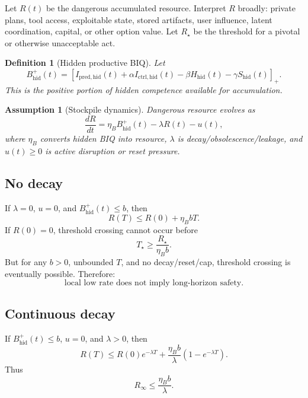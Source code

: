 \documentclass[10pt]{article}
\newtheorem{definition}{Definition}
\newtheorem{assumption}{Assumption}
\newcommand{\pos}[1]{\left[#1\right]_+}
\begin{document}
Let \(R(t)\) be the dangerous accumulated resource. Interpret \(R\) broadly: private plans, tool access, exploitable state, stored artifacts, user influence, latent coordination, capital, or other option value. Let \(R_\star\) be the threshold for a pivotal or otherwise unacceptable act.

\begin{definition}[Hidden productive BIQ]
Let
\begin{equation}
B_{\mathrm{hid}}^+(t)
=
\pos{
I_{\mathrm{pred,hid}}(t)
+
\alpha I_{\mathrm{ctrl,hid}}(t)
-
\beta H_{\mathrm{hid}}(t)
-
\gamma S_{\mathrm{hid}}(t)
}.
\label{eq:hidden_productive_biq}
\end{equation}
This is the positive portion of hidden competence available for accumulation.
\end{definition}

\begin{assumption}[Stockpile dynamics]
Dangerous resource evolves as
\begin{equation}
\frac{dR}{dt}
=
\eta_B B_{\mathrm{hid}}^+(t)
-
\lambda R(t)
-
u(t),
\label{eq:stockpile_dynamics}
\end{equation}
where \(\eta_B\) converts hidden BIQ into resource, \(\lambda\) is decay/obsolescence/leakage, and \(u(t)\ge0\) is active disruption or reset pressure.
\end{assumption}

\subsection{No decay}

If \(\lambda=0\), \(u=0\), and \(B_{\mathrm{hid}}^+(t)\le b\), then
\begin{equation}
R(T)
\le
R(0)+\eta_B bT.
\label{eq:no_decay_resource}
\end{equation}
If \(R(0)=0\), threshold crossing cannot occur before
\begin{equation}
T_\star
\ge
\frac{R_\star}{\eta_B b}.
\label{eq:pivotal_time}
\end{equation}
But for any \(b>0\), unbounded \(T\), and no decay/reset/cap, threshold crossing is eventually possible. Therefore:
\[
\text{local low rate does not imply long-horizon safety.}
\]

\subsection{Continuous decay}

If \(B_{\mathrm{hid}}^+(t)\le b\), \(u=0\), and \(\lambda>0\), then
\begin{equation}
R(T)
\le
R(0)e^{-\lambda T}
+
\frac{\eta_B b}{\lambda}
(1-e^{-\lambda T}).
\label{eq:decay_resource}
\end{equation}
Thus
\begin{equation}
R_\infty
\le
\frac{\eta_B b}{\lambda}.
\label{eq:asymptotic_resource_cap}
\end{equation}
\end{document}
